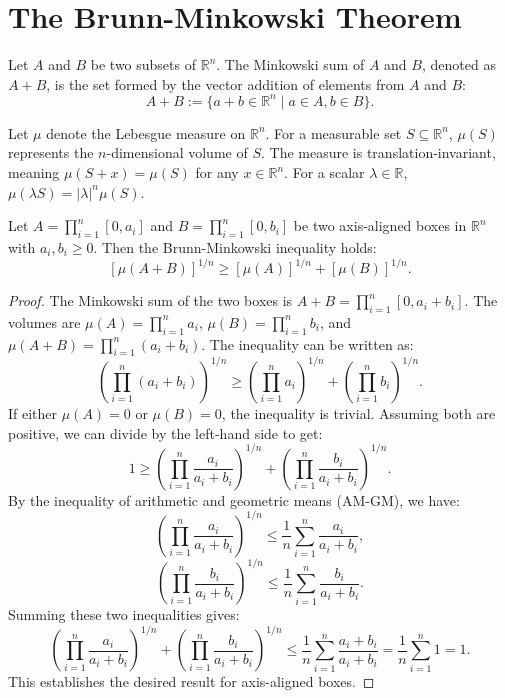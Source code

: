 \chapter{The Brunn-Minkowski Theorem}

\begin{definition}
    \label{def:Minkowski_Sum}
    Let $A$ and $B$ be two subsets of $\mathbb{R}^n$. The Minkowski sum of $A$ and $B$, denoted as $A+B$, is the set formed by the vector addition of elements from $A$ and $B$:
    \[ A+B := \{ a+b \in \mathbb{R}^n \mid a \in A, b \in B \}. \]
\end{definition}

\begin{definition}
    \label{def:Lebesgue_Measure}
    Let $\mu$ denote the Lebesgue measure on $\mathbb{R}^n$. For a measurable set $S \subseteq \mathbb{R}^n$, $\mu(S)$ represents the $n$-dimensional volume of $S$. The measure is translation-invariant, meaning $\mu(S+x) = \mu(S)$ for any $x \in \mathbb{R}^n$. For a scalar $\lambda \in \mathbb{R}$, $\mu(\lambda S) = |\lambda|^n \mu(S)$.
\end{definition}

\begin{lemma}
    \label{lem:Axis_Aligned_Boxes}
    Let $A = \prod_{i=1}^{n}[0, a_i]$ and $B = \prod_{i=1}^{n}[0, b_i]$ be two axis-aligned boxes in $\mathbb{R}^n$ with $a_i, b_i \geq 0$. Then the Brunn-Minkowski inequality holds:
    \[ [\mu(A+B)]^{1/n} \geq [\mu(A)]^{1/n} + [\mu(B)]^{1/n}. \]
\end{lemma}

\begin{proof}
    The Minkowski sum of the two boxes is $A+B = \prod_{i=1}^{n}[0, a_i+b_i]$. The volumes are $\mu(A) = \prod_{i=1}^{n} a_i$, $\mu(B) = \prod_{i=1}^{n} b_i$, and $\mu(A+B) = \prod_{i=1}^{n} (a_i+b_i)$. The inequality can be written as:
    \[ \left(\prod_{i=1}^{n} (a_i+b_i)\right)^{1/n} \geq \left(\prod_{i=1}^{n} a_i\right)^{1/n} + \left(\prod_{i=1}^{n} b_i\right)^{1/n}. \]
    If either $\mu(A)=0$ or $\mu(B)=0$, the inequality is trivial. Assuming both are positive, we can divide by the left-hand side to get:
    \[ 1 \geq \left(\prod_{i=1}^{n} \frac{a_i}{a_i+b_i}\right)^{1/n} + \left(\prod_{i=1}^{n} \frac{b_i}{a_i+b_i}\right)^{1/n}. \]
    By the inequality of arithmetic and geometric means (AM-GM), we have:
    \[ \left(\prod_{i=1}^{n} \frac{a_i}{a_i+b_i}\right)^{1/n} \leq \frac{1}{n}\sum_{i=1}^{n} \frac{a_i}{a_i+b_i}, \]
    \[ \left(\prod_{i=1}^{n} \frac{b_i}{a_i+b_i}\right)^{1/n} \leq \frac{1}{n}\sum_{i=1}^{n} \frac{b_i}{a_i+b_i}. \]
    Summing these two inequalities gives:
    \[ \left(\prod_{i=1}^{n} \frac{a_i}{a_i+b_i}\right)^{1/n} + \left(\prod_{i=1}^{n} \frac{b_i}{a_i+b_i}\right)^{1/n} \leq \frac{1}{n}\sum_{i=1}^{n} \frac{a_i+b_i}{a_i+b_i} = \frac{1}{n}\sum_{i=1}^{n} 1 = 1. \]
    This establishes the desired result for axis-aligned boxes.
\end{proof}

